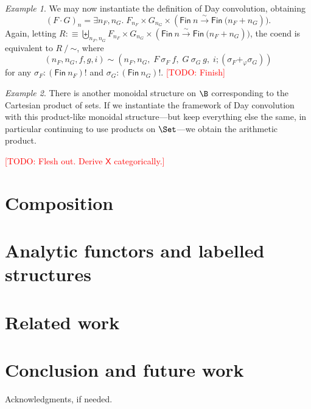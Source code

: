 \documentclass[preprint,authoryear]{sigplanconf}
\newcommand{\todo}[1]{\textcolor{red}{[TODO: #1]}}
\newcommand{\todo}[1]{}
\newcommand{\exist}[1]{\exists #1.\;}
\newcommand{\msf}[1]{\ensuremath{\mathsf{#1}}\xspace}
\newcommand{\bij}{\stackrel{\sim}{\longrightarrow}}
\newcommand{\perm}[1]{#1!}
\let\oldequiv\equiv
\newcommand{\jeq}{\oldequiv}          %
\newcommand{\defeq}{\mathrel{:\jeq}}  %
\renewcommand{\equiv}{\simeq}         %
\newcommand{\quotient}[2]{#1 \mathbin{/} \mathord{#2}}
\theoremstyle{definition}
\theoremstyle{remark}
\newtheorem*{ex}{Example}
\newcommand{\cons}[1]{\ensuremath{\mathsf{#1}}}
\newcommand{\Fin}[1]{\ensuremath{\cons{Fin}\ #1}}
\newcommand{\then}{\mathbin{;}}                       %
\newcommand{\coend}[1]{\exist{#1}}
\providecommand{\Sp}{}
\renewcommand{\Sp}{\msf}
\newcommand{\X}{\Sp{X}}
\newcommand{\sprod}{\cdot}
\begin{document}
\begin{ex}
  We may now instantiate the definition of Day convolution,
  obtaining \[ (F \sprod G)_n = \coend{n_F, n_G} F_{n_F} \times G_{n_G}
  \times (\Fin n \bij \Fin (n_F + n_G)). \] Again, letting $R \defeq
  \biguplus_{n_F, n_G} F_{n_F} \times G_{n_G} \times (\Fin n \bij \Fin
  (n_F + n_G))$, the coend is equivalent to $\quotient{R}{\sim}$,
  where \[ (n_F, n_G, f, g, i) \sim (n_F, n_G,\;F\ \sigma_F\ f,\;G\
  \sigma_G\ g,\;i \then (\sigma_F +_\varphi \sigma_G)) \] for any
  $\sigma_F : \perm{(\Fin n_F)}$ and $\sigma_G : \perm{(\Fin
    n_G)}$. \todo{Finish}
\end{ex}

\begin{ex}
  There is another monoidal structure on $\B$ corresponding to the
  Cartesian product of sets. If we instantiate the framework of Day
  convolution with this product-like monoidal structure---but
  keep everything else the same, in particular continuing to use
  products on $\Set$---we obtain the arithmetic product.

  \todo{Flesh out.  Derive $\X$ categorically.}
\end{ex}

\section{Composition}
\label{sec:composition}

\section{Analytic functors and labelled structures}
\label{sec:analytic-labelled}

\section{Related work}
\label{sec:related-work}

\section{Conclusion and future work}
\label{sec:conclusion}


\acks

Acknowledgments, if needed.








\end{document}
